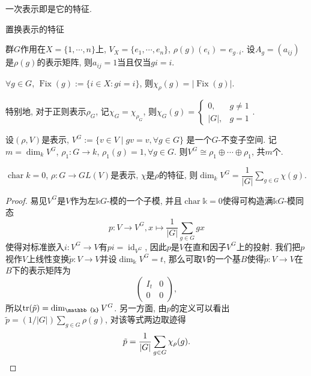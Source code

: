 \begin{example}
    一次表示即是它的特征.
\end{example}

\begin{example} 置换表示的特征\par
    \qquad 群$G$作用在$X=\{1,\cdots,n\}$上, $V_X=\{e_1,\cdots,e_n\}$, 
    $\rho(g)(e_i)=e_{g\cdot i}$. 设$A_g=(a_{ij})$是$\rho(g)$的表示矩阵, 
    则$a_{ij}=1$当且仅当$gi=i$.\par
    \qquad $\forall g\in G$, $\operatorname{Fix}(g):=\{i\in X: gi=i\}$, 
    则$\chi_\rho (g)=|\operatorname{Fix}(g)|$.\par
    \qquad 特别地, 对于正则表示$\rho_G$, 记$\chi_G=\chi_{\rho_G}$, 
    则$\chi_G(g)=\begin{cases} 0, &g\neq 1\\ |G|, &g=1 \end{cases}$.
\end{example}

\begin{definition}
    设$(\rho,V)$是表示, $V^G:=\{v\in V\mid gv=v, \forall g\in G\}$
    是一个$G$-不变子空间. 记$m=\dim_k V^G$, 
    $\rho_1:G\rightarrow k$, $\rho_1(g)=1, \forall g\in G$. 
    则$V^G\cong \rho_1\oplus \cdots \oplus \rho_1$, 共$m$个.
\end{definition}


\begin{proposition}
    $\operatorname{char} k=0$, $\rho:G\rightarrow GL(V)$是表示, 
    $\chi$是$\rho$的特征, 则$\dim_k V^G=
    \dfrac{1}{|G|}\sum\limits_{g\in G} \chi(g)$.
\end{proposition}
\begin{proof}
    易见$V^{G}$是$V$作为左$\mathbb{k}G$-模的一个子模, 
    并且$\operatorname{char}\mathbb{k}=0$使得可构造满$\mathbb{k}G$-模同态
    $$p:V\to V^{G},x\mapsto \frac{1}{|G|} \sum_{g \in G} gx$$
    使得对标准嵌入$i:V^{G}\to V$有$pi=\operatorname{id}_{V^{G}}$, 
    因此$p$是$V$在直和因子$V^{G}$上的投射. 
    我们把$p$视作$V$上线性变换$\tilde{p}:V\to V$并设$\dim_{\mathbb{k}}V^{G}=t$, 
    那么可取$V$的一个基$B$使得$\tilde{p}:V\to V$在$B$下的表示矩阵为
$$\left(\begin{array}{cc}
I_{t} & 0 \\
0 & 0
\end{array}\right),$$
所以$\tr(\tilde{p})=\dim_{\mathbb{k}}V^{G}$. 
另一方面, 由$p$的定义可以看出$\tilde{p}=(1/|G|)\sum\limits_{g\in G}\rho(g)$, 
对该等式两边取迹得
$$\tilde{p}=\frac{1}{|G|} \sum_{g \in G}\chi_{\rho}(g).\qedhere$$
\end{proof}


